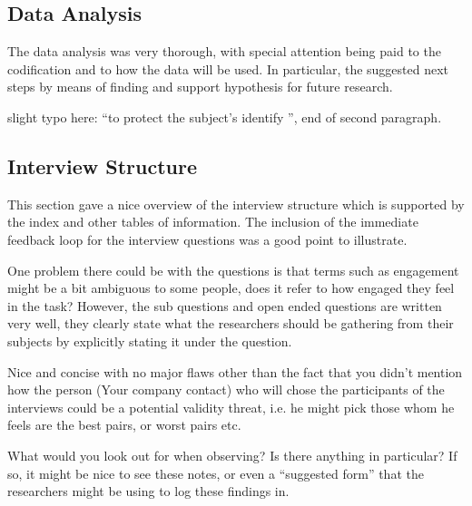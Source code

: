 \documentclass[times, 10pt,twocolumn]{article}
\begin{document}
\subsection{Data Analysis}
The data analysis was very thorough, with special attention being paid to the codification and to how the data will be used. In particular, the suggested next steps by means of finding and support hypothesis for future research.

slight typo here: ``to protect the subject’s identify '', end of second paragraph.

\subsection{Interview Structure}
This section gave a nice overview of the interview structure which is supported by the index and other tables of information. The inclusion of the immediate feedback loop for the interview questions was a good point to illustrate.

One problem there could be with the questions is that terms such as engagement might be a bit ambiguous to some people, does it refer to how engaged they feel in the task? However, the sub questions and open ended questions are written very well, they clearly state what the researchers should be gathering from their subjects by explicitly stating it under the question.

Nice and concise with no major flaws other than the fact that you didn't mention how the person (Your company contact) who will chose the participants of the interviews could be a potential validity threat, i.e. he might pick those whom he feels are the best pairs, or worst pairs etc.

What would you look out for when observing? Is there anything in particular? If so, it might be nice to see these notes, or even a ``suggested form'' that the researchers might be using to log these findings in.
\end{document}
